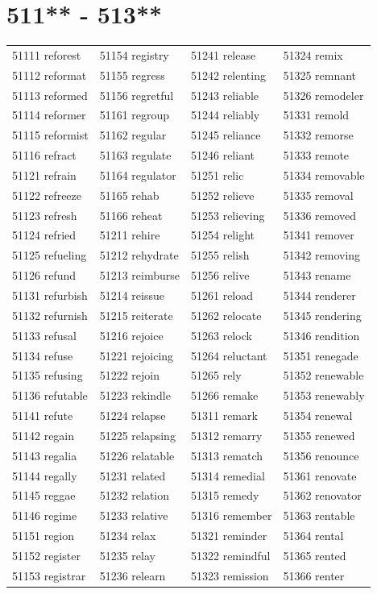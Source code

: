 \documentclass[10pt, oneside]{book}
\begin{document}
\begin{table}
	\centering
	\section*{511** - 513**}
	\begin{tabular}{l l l l}
51111 reforest &51154 registry &51241 release &51324 remix\\
51112 reformat &51155 regress &51242 relenting &51325 remnant\\
51113 reformed &51156 regretful &51243 reliable &51326 remodeler\\
51114 reformer &51161 regroup &51244 reliably &51331 remold\\
51115 reformist &51162 regular &51245 reliance &51332 remorse\\
51116 refract &51163 regulate &51246 reliant &51333 remote\\
51121 refrain &51164 regulator &51251 relic &51334 removable\\
51122 refreeze &51165 rehab &51252 relieve &51335 removal\\
51123 refresh &51166 reheat &51253 relieving &51336 removed\\
51124 refried &51211 rehire &51254 relight &51341 remover\\
51125 refueling &51212 rehydrate &51255 relish &51342 removing\\
51126 refund &51213 reimburse &51256 relive &51343 rename\\
51131 refurbish &51214 reissue &51261 reload &51344 renderer\\
51132 refurnish &51215 reiterate &51262 relocate &51345 rendering\\
51133 refusal &51216 rejoice &51263 relock &51346 rendition\\
51134 refuse &51221 rejoicing &51264 reluctant &51351 renegade\\
51135 refusing &51222 rejoin &51265 rely &51352 renewable\\
51136 refutable &51223 rekindle &51266 remake &51353 renewably\\
51141 refute &51224 relapse &51311 remark &51354 renewal\\
51142 regain &51225 relapsing &51312 remarry &51355 renewed\\
51143 regalia &51226 relatable &51313 rematch &51356 renounce\\
51144 regally &51231 related &51314 remedial &51361 renovate\\
51145 reggae &51232 relation &51315 remedy &51362 renovator\\
51146 regime &51233 relative &51316 remember &51363 rentable\\
51151 region &51234 relax &51321 reminder &51364 rental\\
51152 register &51235 relay &51322 remindful &51365 rented\\
51153 registrar &51236 relearn &51323 remission &51366 renter\\
	\end{tabular}
 \end{table}
\clearpage
\end{document}
